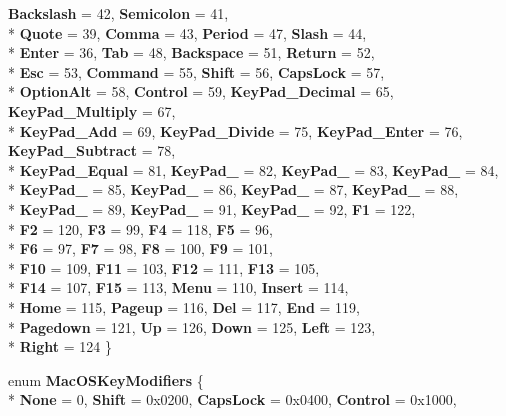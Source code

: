 \begin{DoxyCompactItemize}
{\bfseries Backslash} = 42, 
{\bfseries Semicolon} = 41, 
\\*
{\bfseries Quote} = 39, 
{\bfseries Comma} = 43, 
{\bfseries Period} = 47, 
{\bfseries Slash} = 44, 
\\*
{\bfseries Enter} = 36, 
{\bfseries Tab} = 48, 
{\bfseries Backspace} = 51, 
{\bfseries Return} = 52, 
\\*
{\bfseries Esc} = 53, 
{\bfseries Command} = 55, 
{\bfseries Shift} = 56, 
{\bfseries Caps\-Lock} = 57, 
\\*
{\bfseries Option\-Alt} = 58, 
{\bfseries Control} = 59, 
{\bfseries Key\-Pad\-\_\-\-Decimal} = 65, 
{\bfseries Key\-Pad\-\_\-\-Multiply} = 67, 
\\*
{\bfseries Key\-Pad\-\_\-\-Add} = 69, 
{\bfseries Key\-Pad\-\_\-\-Divide} = 75, 
{\bfseries Key\-Pad\-\_\-\-Enter} = 76, 
{\bfseries Key\-Pad\-\_\-\-Subtract} = 78, 
\\*
{\bfseries Key\-Pad\-\_\-\-Equal} = 81, 
{\bfseries Key\-Pad\-\_} = 82, 
{\bfseries Key\-Pad\-\_} = 83, 
{\bfseries Key\-Pad\-\_} = 84, 
\\*
{\bfseries Key\-Pad\-\_} = 85, 
{\bfseries Key\-Pad\-\_} = 86, 
{\bfseries Key\-Pad\-\_} = 87, 
{\bfseries Key\-Pad\-\_} = 88, 
\\*
{\bfseries Key\-Pad\-\_} = 89, 
{\bfseries Key\-Pad\-\_} = 91, 
{\bfseries Key\-Pad\-\_} = 92, 
{\bfseries F1} = 122, 
\\*
{\bfseries F2} = 120, 
{\bfseries F3} = 99, 
{\bfseries F4} = 118, 
{\bfseries F5} = 96, 
\\*
{\bfseries F6} = 97, 
{\bfseries F7} = 98, 
{\bfseries F8} = 100, 
{\bfseries F9} = 101, 
\\*
{\bfseries F10} = 109, 
{\bfseries F11} = 103, 
{\bfseries F12} = 111, 
{\bfseries F13} = 105, 
\\*
{\bfseries F14} = 107, 
{\bfseries F15} = 113, 
{\bfseries Menu} = 110, 
{\bfseries Insert} = 114, 
\\*
{\bfseries Home} = 115, 
{\bfseries Pageup} = 116, 
{\bfseries Del} = 117, 
{\bfseries End} = 119, 
\\*
{\bfseries Pagedown} = 121, 
{\bfseries Up} = 126, 
{\bfseries Down} = 125, 
{\bfseries Left} = 123, 
\\*
{\bfseries Right} = 124
 \}
\item 
enum {\bfseries Mac\-O\-S\-Key\-Modifiers} \{ \\*
{\bfseries None} = 0, 
{\bfseries Shift} = 0x0200, 
{\bfseries Caps\-Lock} = 0x0400, 
{\bfseries Control} = 0x1000, 

\end{DoxyCompactItemize}
